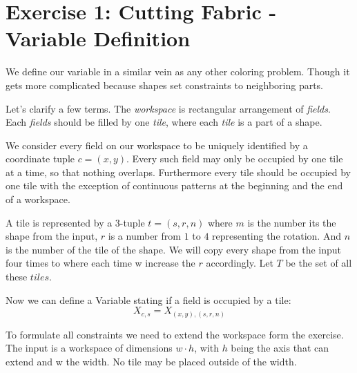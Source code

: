 \documentclass{../base/base}
\begin{document}



\section*{Exercise 1: Cutting Fabric - Variable Definition}

We define our variable in a similar vein as any other coloring problem. Though it gets more complicated because shapes set constraints to neighboring parts.


Let's clarify a few terms. The \textit{workspace} is rectangular arrangement of \textit{fields}. Each \textit{fields} should be filled by one \textit{tile}, where each \textit{tile} is a part of a shape.

We consider every field on our workspace to be uniquely identified by a coordinate tuple $c = (x,y)$.
Every such field may only be occupied by one tile at a time, so that nothing overlaps. Furthermore every tile should be occupied by one tile with the exception of continuous patterns at the beginning and the end of a workspace.

A tile is represented by a 3-tuple $t = (s, r, n)$ where $m$ is the number its the shape from the input, $r$ is a number from $1$ to $4$ representing the rotation. And $n$ is the number of the tile of the shape.
We will copy every shape from the input four times to where each time w increase the $r$ accordingly.
Let $T$ be the set of all these $tiles$.

Now we can define a Variable stating if a field is occupied by a tile:
$$X_{c,s} = X_{(x,y),(s,r,n)}$$

To formulate all constraints we need to extend the workspace form the exercise. The input is a workspace of dimensions $w \cdot h$, with $h$ being the axis that can extend and w the width. No tile may be placed outside of the width.
\end{document}
